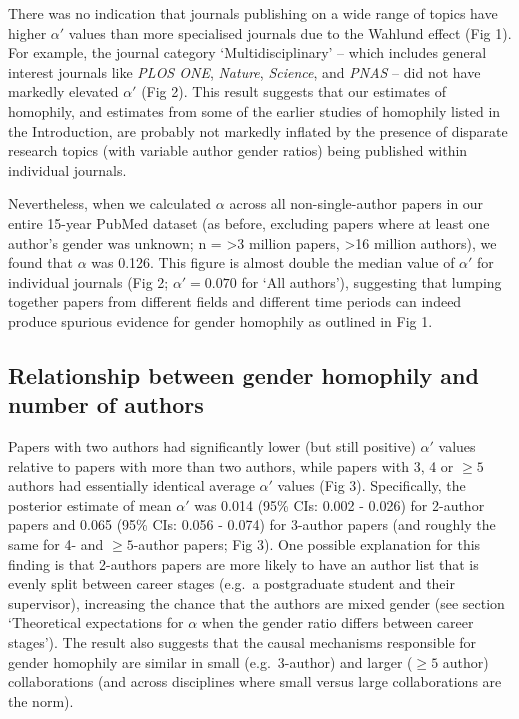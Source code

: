 \documentclass[12pt,]{article}
\begin{document}
There was no indication that journals publishing on a wide range of
topics have higher \(\alpha'\) values than more specialised journals due
to the Wahlund effect (Fig 1). For example, the journal category
`Multidisciplinary' -- which includes general interest journals like
\emph{PLOS ONE}, \emph{Nature}, \emph{Science}, and \emph{PNAS} -- did
not have markedly elevated \(\alpha'\) (Fig 2). This result suggests
that our estimates of homophily, and estimates from some of the earlier
studies of homophily listed in the Introduction, are probably not
markedly inflated by the presence of disparate research topics (with
variable author gender ratios) being published within individual
journals.

Nevertheless, when we calculated \(\alpha\) across all non-single-author
papers in our entire 15-year PubMed dataset (as before, excluding papers
where at least one author's gender was unknown; n = \textgreater{}3
million papers, \textgreater{}16 million authors), we found that
\(\alpha\) was 0.126. This figure is almost double the median value of
\(\alpha'\) for individual journals (Fig 2; \(\alpha' = 0.070\) for `All
authors'), suggesting that lumping together papers from different fields
and different time periods can indeed produce spurious evidence for
gender homophily as outlined in Fig 1.

\hypertarget{relationship-between-gender-homophily-and-number-of-authors}{%
\subsection{Relationship between gender homophily and number of
authors}\label{relationship-between-gender-homophily-and-number-of-authors}}

Papers with two authors had significantly lower (but still positive)
\(\alpha'\) values relative to papers with more than two authors, while
papers with 3, 4 or \(\ge5\) authors had essentially identical average
\(\alpha'\) values (Fig 3). Specifically, the posterior estimate of mean
\(\alpha'\) was 0.014 (95\% CIs: 0.002 - 0.026) for 2-author papers and
0.065 (95\% CIs: 0.056 - 0.074) for 3-author papers (and roughly the
same for 4- and \(\ge5\)-author papers; Fig 3). One possible explanation
for this finding is that 2-authors papers are more likely to have an
author list that is evenly split between career stages (e.g.~a
postgraduate student and their supervisor), increasing the chance that
the authors are mixed gender (see section `Theoretical expectations for
\(\alpha\) when the gender ratio differs between career stages'). The
result also suggests that the causal mechanisms responsible for gender
homophily are similar in small (e.g.~3-author) and larger (\(\ge5\)
author) collaborations (and across disciplines where small versus large
collaborations are the norm).
\end{document}
